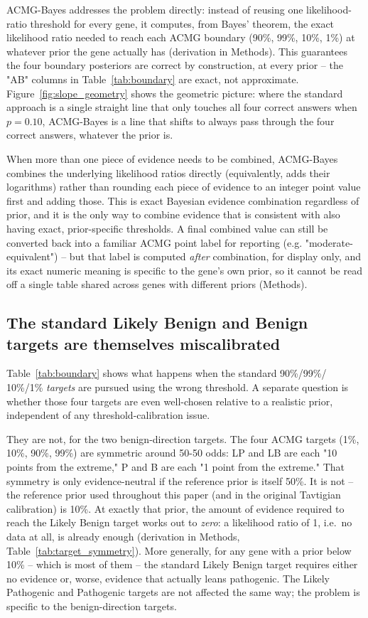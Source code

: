 \documentclass[11pt]{article}
\begin{document}
ACMG-Bayes addresses the problem directly: instead of reusing one
likelihood-ratio threshold for every gene, it computes, from Bayes' theorem,
the exact likelihood ratio needed to reach each ACMG boundary (90\%, 99\%,
10\%, 1\%) at whatever prior the gene actually has (derivation in Methods).
This guarantees the four boundary posteriors are correct by construction, at
every prior -- the "AB" columns in Table~\ref{tab:boundary} are exact, not
approximate. Figure~\ref{fig:slope_geometry} shows the geometric picture:
where the standard approach is a single straight line that only touches all
four correct answers when $p=0.10$, ACMG-Bayes is a line that shifts to
always pass through the four correct answers, whatever the prior is.

When more than one piece of evidence needs to be combined, ACMG-Bayes
combines the underlying likelihood ratios directly (equivalently, adds their
logarithms) rather than rounding each piece of evidence to an integer point
value first and adding those. This is exact Bayesian evidence combination
regardless of prior, and it is the only way to combine evidence that is
consistent with also having exact, prior-specific thresholds. A final
combined value can still be converted back into a familiar ACMG point label
for reporting (e.g. "moderate-equivalent") -- but that label is computed
\emph{after} combination, for display only, and its exact numeric meaning is
specific to the gene's own prior, so it cannot be read off a single table
shared across genes with different priors (Methods).

\subsection*{The standard Likely Benign and Benign targets are themselves miscalibrated}
\label{sec:results-targets}

Table~\ref{tab:boundary} shows what happens when the standard 90\%/99\%/
10\%/1\% \emph{targets} are pursued using the wrong threshold. A separate
question is whether those four targets are even well-chosen relative to a
realistic prior, independent of any threshold-calibration issue.

They are not, for the two benign-direction targets. The four ACMG targets
(1\%, 10\%, 90\%, 99\%) are symmetric around 50-50 odds: LP and LB are each
"10 points from the extreme," P and B are each "1 point from the extreme."
That symmetry is only evidence-neutral if the reference prior is itself
50\%. It is not -- the reference prior used throughout this paper (and in
the original Tavtigian calibration) is 10\%. At exactly that prior, the
amount of evidence required to reach the Likely Benign target works out to
\emph{zero}: a likelihood ratio of 1, i.e.\ no data at all, is already
enough (derivation in Methods, Table~\ref{tab:target_symmetry}). More
generally, for any gene with a prior below 10\% -- which is most of them --
the standard Likely Benign target requires either no evidence or, worse,
evidence that actually leans pathogenic. The Likely Pathogenic and
Pathogenic targets are not affected the same way; the problem is specific
to the benign-direction targets.
\end{document}
